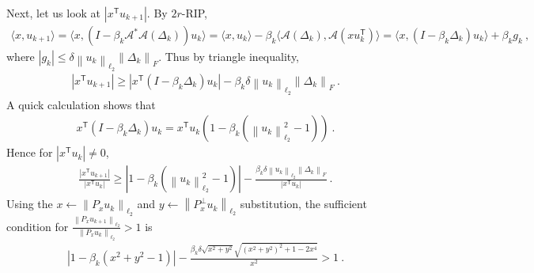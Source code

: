 \documentclass[10pt]{article}
\newcommand{\A}{\ensuremath{\mathcal{A}}}
\newcommand{\twonorm}[1]{\left\lVert #1 \right\rVert_{\ell_2}}
\newcommand{\fronorm}[1]{\left\lVert #1 \right\rVert_{F}}
\newcommand{\ip}[2]{\ensuremath{\langle #1, #2 \rangle}}
\newcommand{\abs}[1]{| #1 |}
\newcommand{\T}{\mathsf{T}}
\begin{document}
Next, let us look at $\abs{x^\T u_{k+1}}$.
By $2r$-RIP,
\begin{align*}
    \ip{x}{u_{k+1}} = \ip{x}{(I-\beta_k \A^*\A(\Delta_k))u_k} = \ip{x}{u_k} - \beta_k \ip{\A(\Delta_k)}{\A(xu_k^\T)} = \ip{x}{(I-\beta_k\Delta_k)u_k} + \beta_k g_k \:,
\end{align*}
where $\abs{g_k} \leq \delta \twonorm{u_k}\fronorm{\Delta_k}$.
Thus by triangle inequality,
\begin{align*}
    \abs{x^\T u_{k+1}} \geq \abs{x^\T (I - \beta_k \Delta_k) u_k} - \beta_k \delta \twonorm{u_k} \fronorm{\Delta_k} \:.
\end{align*}
A quick calculation shows that
\begin{align*}
  x^\T ( I - \beta_k \Delta_k ) u_k = x^\T u_k (1 - \beta_k(\twonorm{u_k}^2 - 1)) \:.
\end{align*}
Hence for $\abs{x^\T u_k} \neq 0$,
\begin{align*}
  \frac{\abs{x^\T u_{k+1}}}{\abs{x^\T u_k}} \geq \abs{1 - \beta_k(\twonorm{u_k}^2 - 1)} - \frac{\beta_k \delta \twonorm{u_k} \fronorm{\Delta_k}}{\abs{x^\T u_k}} \:.
\end{align*}
Using the $x \gets \twonorm{P_x u_k}$ and
$y \gets \twonorm{P^\perp_x u_k}$ substitution, the sufficient condition
for $\frac{\twonorm{P_x u_{k+1}}}{\twonorm{P_x u_k}} > 1$ is
\begin{align*}
  \abs{1 - \beta_k(x^2 + y^2 - 1)} - \frac{\beta_k \delta \sqrt{x^2 + y^2} \sqrt{(x^2 + y^2)^2 + 1 - 2x^4}}{x^2} > 1 \:.
\end{align*}
\end{document}
